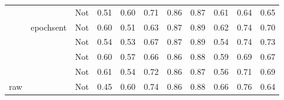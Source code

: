 \begin{tabularx}{\textwidth}{lX|X|X|X|X|X|X|X}
    &           & Not &                       0.51 &           0.60 &            0.71 &                  0.86 &           0.87 &                        0.61 &           0.64 &                         0.65 \\
    & epochsent & Not &                       0.60 &           0.51 &            0.63 &                  0.87 &           0.89 &                        0.62 &           0.74 &                         0.70 \\
    &           & Not &                       0.54 &           0.53 &            0.67 &                  0.87 &           0.89 &                        0.54 &           0.74 &                         0.73 \\
    &           & Not &                       0.60 &           0.57 &            0.66 &                  0.86 &           0.88 &                        0.59 &           0.69 &                         0.67 \\
    &           & Not &                       0.61 &           0.54 &            0.72 &                  0.86 &           0.87 &                        0.56 &           0.71 &                         0.69 \\
raw &           & Not &                       0.45 &           0.60 &            0.74 &                  0.86 &           0.88 &                        0.66 &           0.76 &                         0.64 \\
\bottomrule
\end{tabularx}

